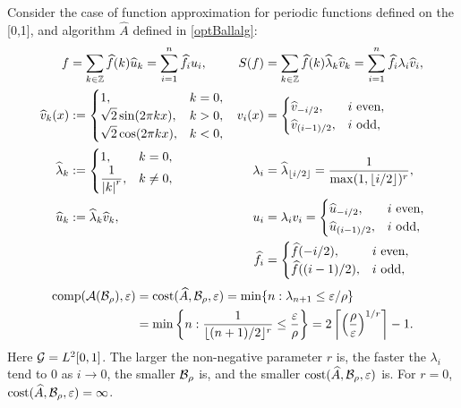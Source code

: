 \documentclass[graybox,footinfo]{svmult}
\newcommand{\DHJRabs}[1]{\ensuremath{{\left \lvert #1 \right \rvert}}}
\begin{document}
\begin{example} Consider the case of function approximation for periodic functions defined on the [0,1], and algorithm $\widehat{A}$ defined in \eqref{optBallalg}:
	\begin{align*}
	f &= \sum_{k \in \bbZ} \widehat{f}(k) \widehat{u}_{k}  = \sum_{i=1}^n \widehat{f}_i u_i, 
	& S(f) & = \sum_{k \in \bbZ} \widehat{f}(k) \widehat{\lambda}_k \widehat{v}_k = \sum_{i=1}^n \widehat{f}_i \lambda_i \widehat{v}_i, \\
	\widehat{v}_{k} (x) &:= \begin{cases} 1, & k = 0, \\
	\displaystyle \sqrt{2} \sin(2\pi k x), & k > 0, \\
	\displaystyle \sqrt{2} \cos(2\pi k x), & k < 0, \\
	\end{cases} 
	& v_i(x) &= \begin{cases} \widehat{v}_{-i/2}, & i \text{ even},\\
	\widehat{v}_{(i-1)/2}, & i \text{ odd},
	\end{cases} \\
	\widehat{\lambda}_{k} &:= \begin{cases} 1, & k = 0, \\
	\displaystyle \frac{1}{\DHJRabs{k}^r}, & k \ne 0,
	\end{cases}
	& \lambda_i &= \widehat{\lambda}_{\lfloor i/2\rfloor} = \frac{1}{\max(1,\lfloor i/2\rfloor)^r}, \\
	\widehat{u}_{k} &:=  \widehat{\lambda}_k \widehat{v}_k,
	& u_i & = \lambda_i v_i = \begin{cases} \widehat{u}_{-i/2}, & i \text{ even},\\
	\widehat{u}_{(i-1)/2}, & i \text{ odd},
	\end{cases}
	\\
	&&\widehat{f}_i& = \begin{cases} \widehat{f}(-i/2), & i \text{ even},\\
	\widehat{f}((i-1)/2), & i \text{ odd},
	\end{cases}
	\end{align*}
	\begin{align*}
	\textup{comp}({\mathcal{A}}({\mathcal{B}}_{\rho}),\varepsilon) &= \textup{cost}(\widehat{A},{\mathcal{B}}_{\rho},\varepsilon) 
	=\min\{ n : \lambda_{n+1} \le \varepsilon/\rho \} \\
	& = \min \left\{ n : \frac{1}{\lfloor (n+1)/2 \rfloor^r} \le \frac{\varepsilon}{\rho} \right\} 
	= 2 \left \lceil \left(\frac{\rho}{\varepsilon} \right)^{1/r} \right \rceil - 1.
	\end{align*}
	Here ${\mathcal{G}}=L^2[0,1]$.  The larger the non-negative parameter $r$ is, the faster the $\lambda_i$ tend to 0 as $ i \to 0$, the smaller ${\mathcal{B}}_\rho$ is, and the smaller  $\textup{cost}(\widehat{A},{\mathcal{B}}_{\rho},\varepsilon)$ is.  For $r = 0$, $\textup{cost}(\widehat{A},{\mathcal{B}}_{\rho},\varepsilon) = \infty$.
\end{example}
\end{document}
